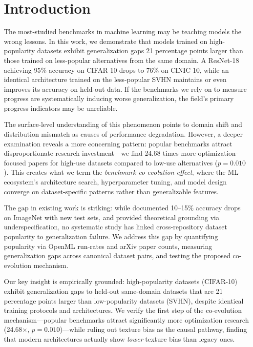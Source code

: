 \section{Introduction}

The most-studied benchmarks in machine learning may be teaching models the wrong lessons. In this work, we demonstrate that models trained on high-popularity datasets exhibit generalization gaps 21 percentage points larger than those trained on less-popular alternatives from the same domain. A ResNet-18 achieving 95\% accuracy on CIFAR-10 drops to 76\% on CINIC-10, while an identical architecture trained on the less-popular SVHN maintains or even improves its accuracy on held-out data. If the benchmarks we rely on to measure progress are systematically inducing worse generalization, the field's primary progress indicators may be unreliable.

The surface-level understanding of this phenomenon points to domain shift and distribution mismatch as causes of performance degradation. However, a deeper examination reveals a more concerning pattern: popular benchmarks attract disproportionate research investment---we find 24.68 times more optimization-focused papers for high-use datasets compared to low-use alternatives ($p=0.010$). This creates what we term the \emph{benchmark co-evolution effect}, where the ML ecosystem's architecture search, hyperparameter tuning, and model design converge on dataset-specific patterns rather than generalizable features.

The gap in existing work is striking: while \citet{recht2019imagenet} documented 10--15\% accuracy drops on ImageNet with new test sets, and \citet{damour2020underspecification} provided theoretical grounding via underspecification, no systematic study has linked cross-repository dataset popularity to generalization failure. We address this gap by quantifying popularity via OpenML run-rates and arXiv paper counts, measuring generalization gaps across canonical dataset pairs, and testing the proposed co-evolution mechanism.

Our key insight is empirically grounded: high-popularity datasets (CIFAR-10) exhibit generalization gaps to held-out same-domain datasets that are 21 percentage points larger than low-popularity datasets (SVHN), despite identical training protocols and architectures. We verify the first step of the co-evolution mechanism---popular benchmarks attract significantly more optimization research (24.68$\times$, $p=0.010$)---while ruling out texture bias as the causal pathway, finding that modern architectures actually show \emph{lower} texture bias than legacy ones.

